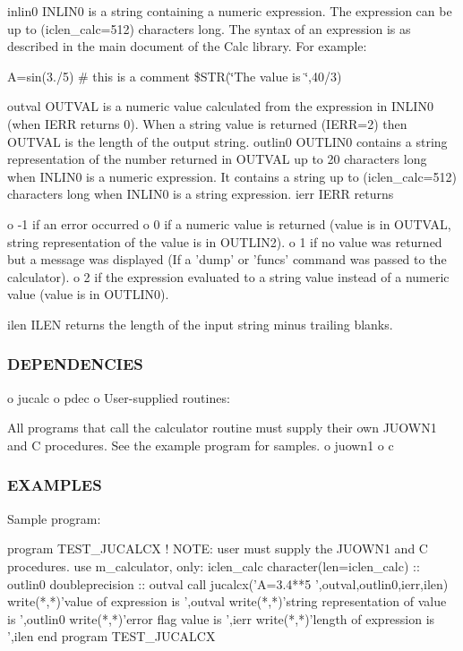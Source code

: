 inlin0 I\+N\+L\+I\+N0 is a string containing a numeric expression. The expression can be up to (iclen\+\_\+calc=512) characters long. The syntax of an expression is as described in the main document of the Calc library. For example\+:

\textquotesingle{}A=sin(3./5)\textquotesingle{} \textquotesingle{}\# this is a comment\textquotesingle{} \textquotesingle{}\$\+S\+TR(\char`\"{}\+The value is \char`\"{},40/3)\textquotesingle{}

outval O\+U\+T\+V\+AL is a numeric value calculated from the expression in I\+N\+L\+I\+N0 (when I\+E\+RR returns 0). When a string value is returned (I\+E\+RR=2) then O\+U\+T\+V\+AL is the length of the output string. outlin0 O\+U\+T\+L\+I\+N0 contains a string representation of the number returned in O\+U\+T\+V\+AL up to 20 characters long when I\+N\+L\+I\+N0 is a numeric expression. It contains a string up to (iclen\+\_\+calc=512) characters long when I\+N\+L\+I\+N0 is a string expression. ierr I\+E\+RR returns \begin{DoxyVerb}    o -1 if an error occurred
    o 0 if a numeric value is returned (value is in OUTVAL, string
      representation of the value is in OUTLIN2).
    o 1 if no value was returned but a message was displayed (If a 'dump'
      or 'funcs' command was passed to the calculator).
    o 2 if the expression evaluated to a string value instead of a
      numeric value (value is in OUTLIN0).
\end{DoxyVerb}
 ilen I\+L\+EN returns the length of the input string minus trailing blanks.

\subsubsection*{D\+E\+P\+E\+N\+D\+E\+N\+C\+I\+ES}

o jucalc o pdec o User-\/supplied routines\+:

All programs that call the calculator routine must supply their own J\+U\+O\+W\+N1 and C procedures. See the example program for samples. o juown1 o c \subsubsection*{E\+X\+A\+M\+P\+L\+ES}

\begin{DoxyVerb}Sample program:

 program TEST_JUCALCX
 !     NOTE: user must supply the JUOWN1 and C procedures.
 use m_calculator, only: iclen_calc
 character(len=iclen_calc) ::  outlin0
 doubleprecision :: outval
 call jucalcx('A=3.4**5    ',outval,outlin0,ierr,ilen)
 write(*,*)'value of expression is ',outval
 write(*,*)'string representation of value is ',outlin0
 write(*,*)'error flag value is ',ierr
 write(*,*)'length of expression is ',ilen
 end program TEST_JUCALCX
\end{DoxyVerb}



